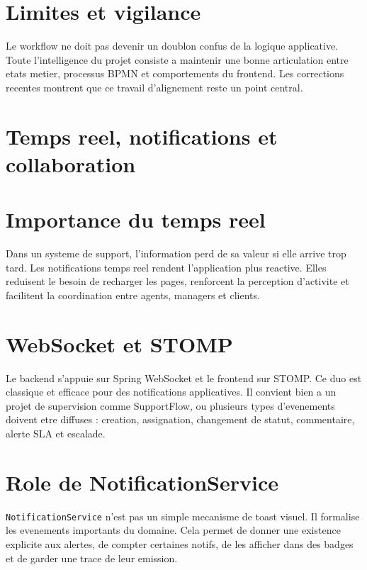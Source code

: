 \section{Limites et vigilance}

Le workflow ne doit pas devenir un doublon confus de la logique applicative. Toute l'intelligence du projet consiste a maintenir une bonne articulation entre etats metier, processus BPMN et comportements du frontend. Les corrections recentes montrent que ce travail d'alignement reste un point central.



\section{Temps reel, notifications et collaboration}

\section{Importance du temps reel}

Dans un systeme de support, l'information perd de sa valeur si elle arrive trop tard. Les notifications temps reel rendent l'application plus reactive. Elles reduisent le besoin de recharger les pages, renforcent la perception d'activite et facilitent la coordination entre agents, managers et clients.

\section{WebSocket et STOMP}

Le backend s'appuie sur Spring WebSocket et le frontend sur STOMP. Ce duo est classique et efficace pour des notifications applicatives. Il convient bien a un projet de supervision comme SupportFlow, ou plusieurs types d'evenements doivent etre diffuses : creation, assignation, changement de statut, commentaire, alerte SLA et escalade.

\section{Role de NotificationService}

\texttt{NotificationService} n'est pas un simple mecanisme de toast visuel. Il formalise les evenements importants du domaine. Cela permet de donner une existence explicite aux alertes, de compter certaines notifs, de les afficher dans des badges et de garder une trace de leur emission.

